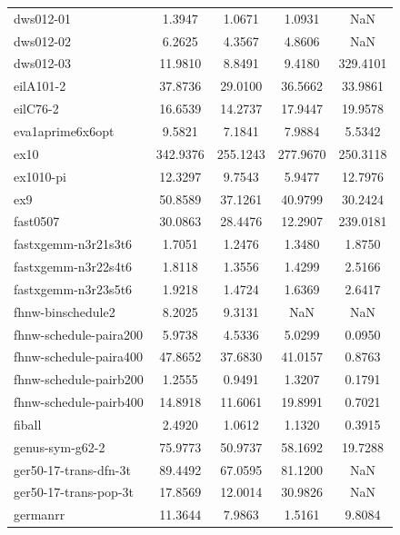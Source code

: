 \begin{longtable}{lcccc}
dws012-01                   &    1.3947 &   1.0671 &    1.0931 &       NaN \\
dws012-02                   &    6.2625 &   4.3567 &    4.8606 &       NaN \\
dws012-03                   &   11.9810 &   8.8491 &    9.4180 &  329.4101 \\
eilA101-2                   &   37.8736 &  29.0100 &   36.5662 &   33.9861 \\
eilC76-2                    &   16.6539 &  14.2737 &   17.9447 &   19.9578 \\
eva1aprime6x6opt            &    9.5821 &   7.1841 &    7.9884 &    5.5342 \\
ex10                        &  342.9376 & 255.1243 &  277.9670 &  250.3118 \\
ex1010-pi                   &   12.3297 &   9.7543 &    5.9477 &   12.7976 \\
ex9                         &   50.8589 &  37.1261 &   40.9799 &   30.2424 \\
fast0507                    &   30.0863 &  28.4476 &   12.2907 &  239.0181 \\
fastxgemm-n3r21s3t6         &    1.7051 &   1.2476 &    1.3480 &    1.8750 \\
fastxgemm-n3r22s4t6         &    1.8118 &   1.3556 &    1.4299 &    2.5166 \\
fastxgemm-n3r23s5t6         &    1.9218 &   1.4724 &    1.6369 &    2.6417 \\
fhnw-binschedule2           &    8.2025 &   9.3131 &       NaN &       NaN \\
fhnw-schedule-paira200      &    5.9738 &   4.5336 &    5.0299 &    0.0950 \\
fhnw-schedule-paira400      &   47.8652 &  37.6830 &   41.0157 &    0.8763 \\
fhnw-schedule-pairb200      &    1.2555 &   0.9491 &    1.3207 &    0.1791 \\
fhnw-schedule-pairb400      &   14.8918 &  11.6061 &   19.8991 &    0.7021 \\
fiball                      &    2.4920 &   1.0612 &    1.1320 &    0.3915 \\
genus-sym-g62-2             &   75.9773 &  50.9737 &   58.1692 &   19.7288 \\
ger50-17-trans-dfn-3t       &   89.4492 &  67.0595 &   81.1200 &       NaN \\
ger50-17-trans-pop-3t       &   17.8569 &  12.0014 &   30.9826 &       NaN \\
germanrr                    &   11.3644 &   7.9863 &    1.5161 &    9.8084 \\

\end{longtable}
